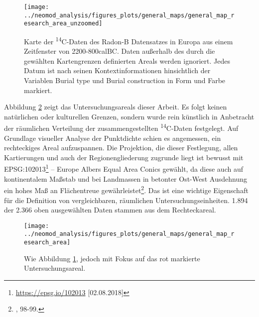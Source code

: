 \documentclass[openany,twoside,twocolumn]{book}
\let\rmarkdownfootnote\footnote%
\def\footnote{\protect\rmarkdownfootnote}
\begin{document}
\begin{figure}
\texttt{[image: ../neomod\_analysis/figures\_plots/general\_maps/general\_map\_research\_area\_unzoomed]} \caption[Übersichtskarte der \textsuperscript{14}C Daten an bronzezeitlichen Gräbern in Europa]{Karte der \textsuperscript{14}C-Daten des Radon-B Datensatzes in Europa aus einem Zeitfenster von 2200-800calBC. Daten außerhalb des durch die gewählten Kartengrenzen definierten Areals werden ignoriert. Jedes Datum ist nach seinen Kontextinformationen hinsichtlich der Variablen Burial type und Burial construction in Form und Farbe markiert.}\label{fig:general-map}
\end{figure}

Abbildung \ref{fig:general-map-research-area} zeigt das
Untersuchungsareals dieser Arbeit. Es folgt keinen natürlichen oder
kulturellen Grenzen, sondern wurde rein künstlich in Anbetracht der
räumlichen Verteilung der zusammengestellten \textsuperscript{14}C-Daten
festgelegt. Auf Grundlage visueller Analyse der Punktdichte schien es
angemessen, ein rechteckiges Areal aufzuspannen. Die Projektion, die
dieser Festlegung, allen Kartierungen und auch der Regionengliederung
zugrunde liegt ist bewusst mit EPSG:102013\footnote{\url{https://epsg.io/102013}
  {[}02.08.2018{]}} -- Europe Albers Equal Area Conics gewählt, da diese
auch auf kontinentalem Maßstab und bei Landmassen in betonter Ost-West
Ausdehnung ein hohes Maß an Flächentreue gewährleistet\footnote{\textcite{snyder_map_1987},
  98-99.}. Das ist eine wichtige Eigenschaft für die Definition von
vergleichbaren, räumlichen Untersuchungseinheiten. 1.894 der 2.366 oben
ausgewählten Daten stammen aus dem Rechteckareal.

\begin{figure}
\texttt{[image: ../neomod\_analysis/figures\_plots/general\_maps/general\_map\_research\_area]} \caption[Karte mit \textsuperscript{14}C Daten und Grenzen des Untersuchungsareals]{Wie Abbildung \ref{fig:general-map}, jedoch mit Fokus auf das rot markierte Untersuchungsareal.}\label{fig:general-map-research-area}
\end{figure}
\end{document}
